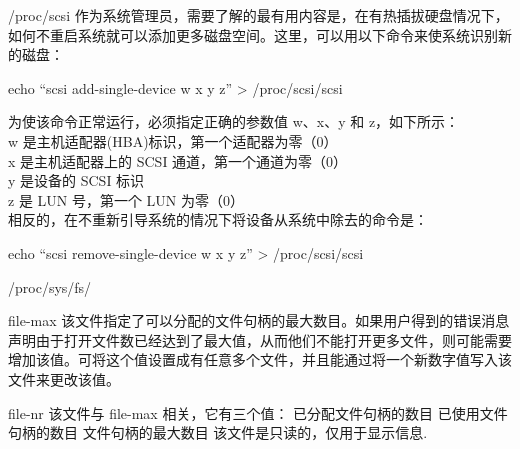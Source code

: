 \begin{frame}{/proc/scsi}
作为系统管理员，需要了解的最有用内容是，在有热插拔硬盘情况下，如何不重启系统就可以添加更多磁盘空间。这里，可以用以下命令来使系统识别新的磁盘：

echo “scsi add-single-device w x y z” > /proc/scsi/scsi

为使该命令正常运行，必须指定正确的参数值 w、x、y 和 z，如下所示：\\
w 是主机适配器(HBA)标识，第一个适配器为零（0） \\
x 是主机适配器上的 SCSI 通道，第一个通道为零（0） \\
y 是设备的 SCSI 标识 \\ 
z 是 LUN 号，第一个 LUN 为零（0） \\


相反的，在不重新引导系统的情况下将设备从系统中除去的命令是：

echo “scsi remove-single-device w x y z” > /proc/scsi/scsi

\end{frame}

\begin{frame}{/proc/sys/fs/}
\begin{exampleblock}{file-max}
该文件指定了可以分配的文件句柄的最大数目。如果用户得到的错误消息声明由于打开文件数已经达到了最大值，从而他们不能打开更多文件，则可能需要增加该值。可将这个值设置成有任意多个文件，并且能通过将一个新数字值写入该文件来更改该值。
\end{exampleblock}

\begin{exampleblock}{file-nr}
该文件与 file-max 相关，它有三个值：
已分配文件句柄的数目
已使用文件句柄的数目
文件句柄的最大数目
该文件是只读的，仅用于显示信息.
\end{exampleblock}

\end{frame}



